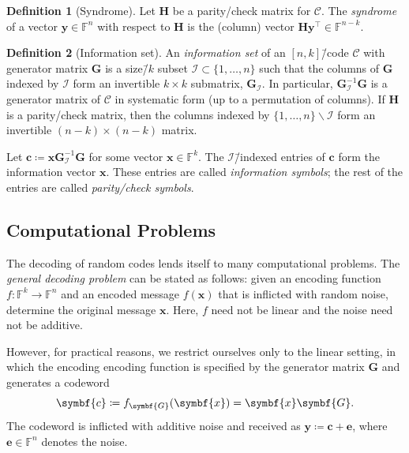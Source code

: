 \documentclass[version=last, paper=A4, parskip=half, oneside,%
toc=bibliography, toc=listof, listof=leveldown]{scrbook}
\theoremstyle{plain}
\theoremstyle{definition}
\newtheorem{definition}{Definition}
\theoremstyle{remark}
\renewcommand*{\vec}{\symbf}
\newcommand*{\mat}{\symbf}
\newcommand*{\trans}{\top}%
\newcommand*{\FF}{\ensuremath{\mathbb{F}}}
\begin{document}
\begin{definition}[Syndrome]
  Let \(\mat{H}\) be a parity\-/check matrix for \(\mathcal{C}\).  The
  \emph{syndrome} of a vector \(\vec{y} \in \FF^n\) with respect to \(\mat{H}\)
  is the (column) vector \(\mat{H} \vec{y}^{\trans} \in \FF^{n - k}\).
\end{definition}

\begin{definition}[Information set]\label{def:information-set}
  An \emph{information set} of an \([n, k]\)\=/code \(\mathcal{C}\) with
  generator matrix \(\mat{G}\) is a size\=/\(k\) subset
  \(\mathcal{I} \subset \{1, \ldots, n\}\) such that the columns of \(\mat{G}\)
  indexed by \(\mathcal{I}\) form an invertible \(k \times k\) submatrix,
  \(\mat{G}_{\mathcal{I}}\).  In particular,
  \(\mat{G}_{\mathcal{I}}^{-1} \mat{G}\) is a generator matrix of
  \(\mathcal{C}\) in systematic form (up to a permutation of columns).  If
  \(\mat{H}\) is a parity\-/check matrix, then the columns indexed by
  \(\{1, \ldots, n\} \smallsetminus \mathcal{I}\) form an invertible
  \((n - k) \times (n - k)\) matrix.
\end{definition}

Let \(\vec{c} \coloneqq \vec{x} \mat{G}_{\mathcal{I}}^{-1} \mat{G}\) for some
vector \(\vec{x} \in \FF^k\).  The \(\mathcal{I}\)\=/indexed entries of
\(\vec{c}\) form the information vector \(\vec{x}\).  These entries are called
\emph{information symbols}; the rest of the entries are called
\emph{parity\-/check symbols}.

\subsection{Computational Problems}\label{sec:LC-computational-problems}

The decoding of random codes lends itself to many computational problems.  The
\emph{general decoding problem} can be stated as follows: given an encoding
function \(f\colon \FF^k \to \FF^n\) and an encoded message \(f(\vec{x})\) that
is inflicted with random noise, determine the original message \(\vec{x}\).
Here, \(f\) need not be linear and the noise need not be additive.

However, for practical reasons, we restrict ourselves only to the linear
setting, in which the encoding encoding function is specified by the generator
matrix \(\mat{G}\) and generates a codeword
\[
  \vec{c} \coloneqq f_{\mat{G}}(\vec{x}) = \vec{x} \mat{G}\text.
\]
The codeword is inflicted with additive noise and received as
\(\vec{y} \coloneqq \vec{c} + \vec{e}\), where \(\vec{e} \in \FF^n\) denotes the
noise.
\end{document}
